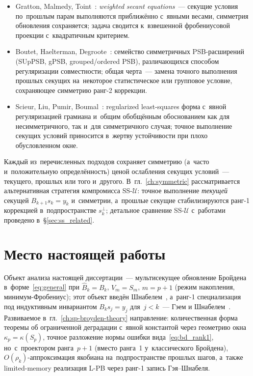 \begin{itemize}[leftmargin=*]
  \item Gratton, Malmedy, Toint~\cite{gratton2015}: \emph{weighted
        secant equations}~--- секущие условия по~прошлым парам
        выполняются приближённо с~явными весами, симметрия
        обновления сохраняется; задача сводится к~взвешенной
        фробениусовой проекции с~квадратичным критерием.
  \item Boutet, Haelterman, Degroote~\cite{boutet2020,boutet2021,boutet2022}:
        семейство симметричных PSB-расширений (SUpPSB, gPSB,
        grouped/ordered PSB), различающихся способом
        регуляризации совместности; общая черта~--- замена
        точного выполнения прошлых секущих на~некоторое
        статистическое или групповое условие, сохраняющее
        симметрию ранг-2 коррекции.
  \item Scieur, Liu, Pumir, Boumal~\cite{scieur2021}: regularized
        least-squares форма с~явной регуляризацией грамиана и~общим
        обобщённым обоснованием как для несимметричного, так и~для
        симметричного случая; точное выполнение секущих условий
        приносится в~жертву устойчивости при плохо обусловленном
        окне.
\end{itemize}

Каждый из~перечисленных подходов сохраняет симметрию (а~часто
и~положительную определённость) ценой ослабления секущих условий~---
текущего, прошлых или того и~другого. В~гл.~\ref{ch:symmetric}
рассматривается альтернативная стратегия компромисса
SS-$\mathcal{U}$: точное выполнение \emph{текущей} секущей
$B_{k+1}s_k = y_k$ и~симметрии, а~прошлые секущие стабилизируются
ранг-1 коррекцией в~подпространстве $s_k^\perp$; детальное сравнение
SS-$\mathcal{U}$ с~работами~\cite{gratton2015,boutet2020,boutet2021,boutet2022,scieur2021}
проведено в~\S\ref{sec:ss_related}.


\section{Место настоящей работы}\label{sec:ch1_place}

Объект анализа настоящей диссертации~--- мультисекущее обновление
Бройдена в~форме~\eqref{eq:general} при $\widehat{B}_k = B_k$, $V_m = S_m$,
$m = p+1$ (режим накопления, минимум-Фробениус); этот объект введён
Шнабелем~\cite{schnabel1983}, а~ранг-1 специализация под индуктивным
инвариантом $B_k s_j = y_j$ для~$j<k$~--- Гэем и
Шнабелем~\cite{gay_schnabel1978}. Развиваемое в~гл.~\ref{ch:sp-broyden-theory}
направление: количественная форма теоремы об ограниченной деградации
с~явной константой через геометрию окна $\kappa_p = \kappa(S_p)$,
точное разложение нормы ошибки вида~\eqref{eq:bd_rank1}, но~с~проектором
ранга~$p{+}1$ (вместо ранга~1 у~классического Бройдена), $O(\rho_k)$-аппроксимация
якобиана на~подпространстве прошлых шагов, а~также limited-memory
реализация L-PB через ранг-1 запись Гэя--Шнабеля.

